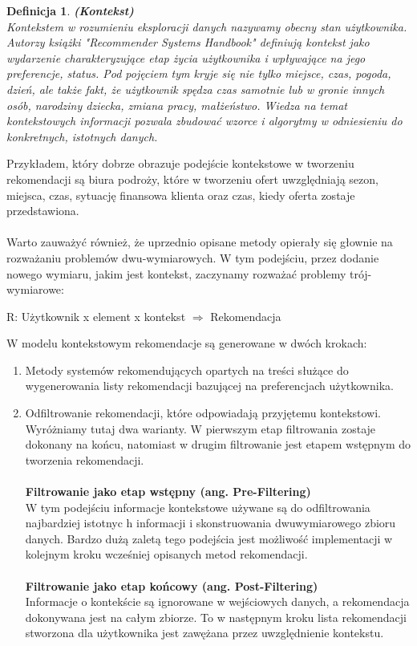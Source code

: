 \documentclass[12pt,a4paper]{report}
\newtheorem{df}{Definicja}
\begin{document}
{\begin{df}\textbf{(Kontekst)}
\\Kontekstem w rozumieniu eksploracji danych nazywamy obecny stan użytkownika. Autorzy książki "Recommender Systems Handbook" definiują kontekst jako wydarzenie charakteryzujące etap życia użytkownika i wpływające na jego preferencje, status. Pod pojęciem tym kryje się nie tylko miejsce, czas, pogoda, dzień, ale także fakt, że użytkownik spędza czas samotnie lub w gronie innych osób, narodziny dziecka, zmiana pracy, małżeństwo. Wiedza na temat kontekstowych informacji pozwala zbudować wzorce i algorytmy w odniesieniu do konkretnych, istotnych danych.
\end{df}
Przykładem, który dobrze obrazuje podejście kontekstowe w tworzeniu rekomendacji są biura podroży, które w tworzeniu ofert uwzględniają sezon, miejsca, czas, sytuację finansowa klienta oraz czas, kiedy oferta zostaje przedstawiona. 
\\
\\Warto zauważyć również, że uprzednio opisane metody opierały się głownie na rozważaniu problemów dwu-wymiarowych. W tym podejściu, przez dodanie nowego wymiaru, jakim jest kontekst, zaczynamy rozważać problemy trój-wymiarowe:
\begin{center}
R: Użytkownik x element x kontekst $ \Rightarrow$ Rekomendacja
\end{center}
W modelu kontekstowym rekomendacje są generowane w dwóch krokach:
\begin{enumerate}
\item Metody systemów rekomendujących opartych na treści służące do wygenerowania listy rekomendacji bazującej na  preferencjach użytkownika.
\item Odfiltrowanie rekomendacji, które odpowiadają przyjętemu kontekstowi.
\\Wyróżniamy tutaj dwa warianty. W pierwszym etap filtrowania zostaje dokonany na końcu, natomiast w drugim filtrowanie jest etapem wstępnym do tworzenia rekomendacji.
\\
\\
\textbf{Filtrowanie jako etap wstępny (ang. Pre-Filtering)}
\\W tym podejściu informacje kontekstowe używane są do odfiltrowania najbardziej istotnyc    h informacji i skonstruowania dwuwymiarowego zbioru danych. Bardzo dużą zaletą tego podejścia jest możliwość implementacji w kolejnym kroku wcześniej opisanych metod rekomendacji. 
\\
\\ \textbf{Filtrowanie jako etap końcowy (ang. Post-Filtering)}
\\Informacje o kontekście są ignorowane w wejściowych danych, a rekomendacja dokonywana jest na całym zbiorze. To w następnym kroku lista rekomendacji stworzona dla użytkownika jest zawężana przez uwzględnienie kontekstu.
\end{enumerate}
}
\end{document}
